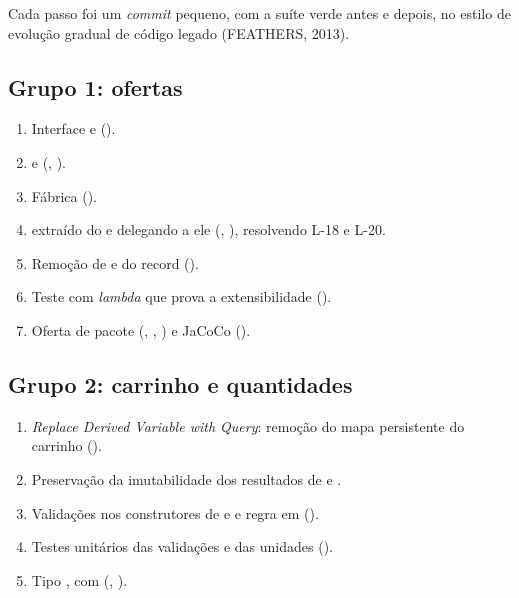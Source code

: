 Cada passo foi um \textit{commit} pequeno, com a suíte verde antes e depois, no estilo de evolução gradual de código legado (FEATHERS, 2013).

\subsection{Grupo 1: ofertas}
\begin{enumerate}
\item Interface  e  ().
\item {} e  (, ).
\item Fábrica  ().
\item {} extraído do  e  delegando a ele (, ), resolvendo L-18 e L-20.
\item Remoção de  e do record  ().
\item Teste com \textit{lambda} que prova a extensibilidade ().
\item Oferta de pacote (, , ) e JaCoCo ().
\end{enumerate}

\subsection{Grupo 2: carrinho e quantidades}
\begin{enumerate}
\item \textit{Replace Derived Variable with Query}: remoção do mapa persistente do carrinho ().
\item Preservação da imutabilidade dos resultados de  e .
\item Validações nos construtores de  e  e regra  em  ().
\item Testes unitários das validações e das unidades ().
\item Tipo , com  (, ).
\end{enumerate}


